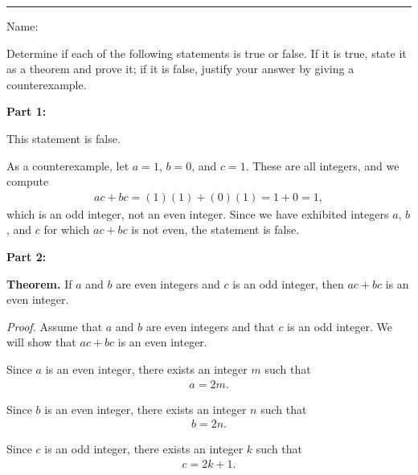 \documentclass[10pt]{exam}
\begin{document}
\hrule

\vspace{.50cm} Name:
\vspace{.25cm}
\begin{questions}

\question Determine if each of the following statements is true or false. If it is true, state it as a theorem and prove it; if it is false, justify your answer by giving a counterexample.


\begin{solution}
\textbf{Part 1:}

This statement is false.

As a counterexample, let $a=1$, $b=0$, and $c=1$. These are all integers, and we compute
\begin{align*}
ac+bc = (1)(1)+(0)(1) = 1+0 = 1,
\end{align*}
which is an odd integer, not an even integer. Since we have exhibited integers $a$, $b$, and $c$ for which $ac+bc$ is not even, the statement is false.

\textbf{Part 2:}

\textbf{Theorem.} If $a$ and $b$ are even integers and $c$ is an odd integer, then $ac+bc$ is an even integer.

\textit{Proof.} Assume that $a$ and $b$ are even integers and that $c$ is an odd integer. We will show that $ac+bc$ is an even integer.

Since $a$ is an even integer, there exists an integer $m$ such that
\begin{align*}
a = 2m.
\end{align*}

Since $b$ is an even integer, there exists an integer $n$ such that
\begin{align*}
b = 2n.
\end{align*}

Since $c$ is an odd integer, there exists an integer $k$ such that
\begin{align*}
c = 2k+1.
\end{align*}
 

\end{solution}
\end{questions}
\end{document}
